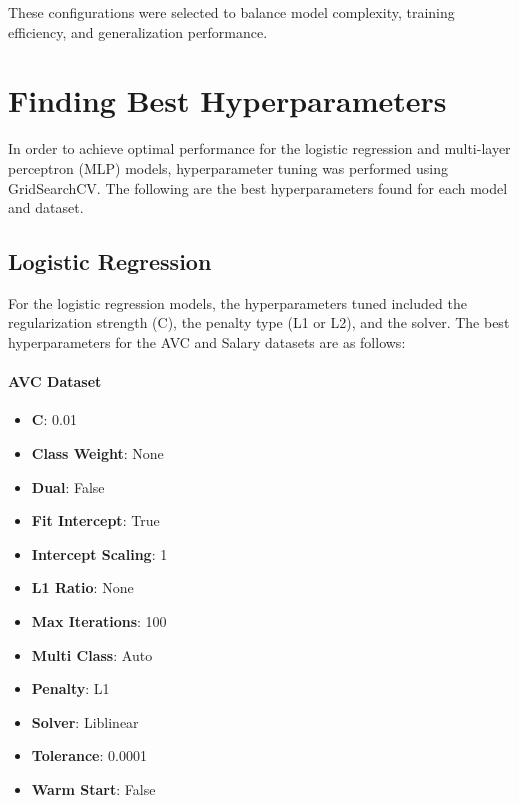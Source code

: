 \documentclass[a4paper,12pt]{article}
\begin{document}
These configurations were selected to balance model complexity, training efficiency, and generalization performance.

\section{Finding Best Hyperparameters}
In order to achieve optimal performance for the logistic regression and multi-layer perceptron (MLP) models, hyperparameter tuning was performed using GridSearchCV. The following are the best hyperparameters found for each model and dataset.

\subsection{Logistic Regression}
For the logistic regression models, the hyperparameters tuned included the regularization strength (C), the penalty type (L1 or L2), and the solver. The best hyperparameters for the AVC and Salary datasets are as follows:

\paragraph{AVC Dataset}
\begin{itemize}
    \item \textbf{C}: 0.01
    \item \textbf{Class Weight}: None
    \item \textbf{Dual}: False
    \item \textbf{Fit Intercept}: True
    \item \textbf{Intercept Scaling}: 1
    \item \textbf{L1 Ratio}: None
    \item \textbf{Max Iterations}: 100
    \item \textbf{Multi Class}: Auto
    \item \textbf{Penalty}: L1
    \item \textbf{Solver}: Liblinear
    \item \textbf{Tolerance}: 0.0001
    \item \textbf{Warm Start}: False
\end{itemize}
\end{document}
